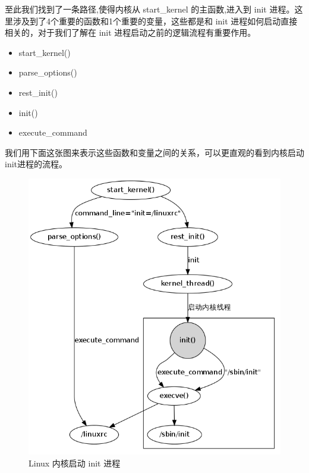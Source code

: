 至此我们找到了一条路径,使得内核从 start\_kernel 的主函数,进入到 init
进程。这里涉及到了4个重要的函数和1个重要的变量，这些都是和 init
进程如何启动直接相关的，对于我们了解在 init
进程启动之前的逻辑流程有重要作用。

\begin{itemize}
\item
  start\_kernel()
\item
  parse\_options()
\item
  rest\_init()
\item
  init()
\item
  execute\_command
\end{itemize}
我们用下面这张图来表示这些函数和变量之间的关系，可以更直观的看到内核启动init进程的流程。

\begin{figure}[htbp]
\centering
\includegraphics{./figures/kernel2init.png}
\caption{Linux 内核启动 init 进程}
\end{figure}

